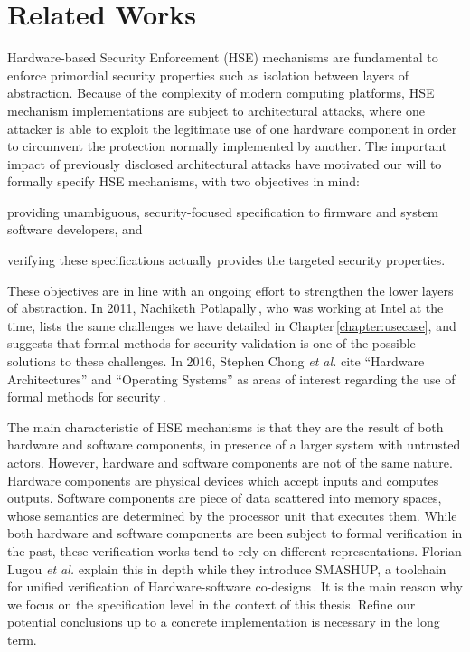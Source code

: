 \chapter{Related Works}
\label{chapter:relatedwork}

Hardware-based Security Enforcement (HSE) mechanisms are fundamental to enforce
primordial security properties such as isolation between layers of abstraction.
%
Because of the complexity of modern computing platforms, HSE mechanism
implementations are subject to architectural attacks, where one attacker is able
to exploit the legitimate use of one hardware component in order to circumvent
the protection normally implemented by another.
%
The important impact of previously disclosed architectural attacks have
motivated our will to formally specify HSE mechanisms, with two objectives in
mind:
%
\begin{inparaenum}[(1)]
\item providing unambiguous, security-focused specification to firmware and
  system software developers, and
%
\item verifying these specifications actually provides the targeted security
  properties.
\end{inparaenum}
%
These objectives are in line with an ongoing effort to strengthen the lower
layers of abstraction.
%
In 2011, Nachiketh Potlapally\,\cite{potlapally2011hardwaresecurity}, who
was working at Intel at the time, lists the same challenges we have detailed in
Chapter\,\ref{chapter:usecase}, and suggests that formal methods for security
validation is one of the possible solutions to these challenges.
%
In 2016, Stephen Chong \emph{et al.} cite ``Hardware Architectures'' and
``Operating Systems'' as areas of interest regarding the use of formal methods
for security\,\cite{chong2016report}.

The main characteristic of HSE mechanisms is that they are the result of both
hardware and software components, in presence of a larger system with untrusted
actors.
%
However, hardware and software components are not of the same nature.
%
Hardware components are physical devices which accept inputs and computes
outputs.
%
Software components are piece of data scattered into memory spaces, whose
semantics are determined by the processor unit that executes them.
%
While both hardware and software components are been subject to formal
verification in the past, these verification works tend to rely on different
representations.
%
Florian Lugou \emph{et al.} explain this in depth while they introduce SMASHUP,
a toolchain for unified verification of Hardware-software
co-designs\,\cite{lugou2017smashup}.
%
It is the main reason why we focus on the specification level in the context of
this thesis.
%
Refine our potential conclusions up to a concrete implementation is necessary in
the long term.

